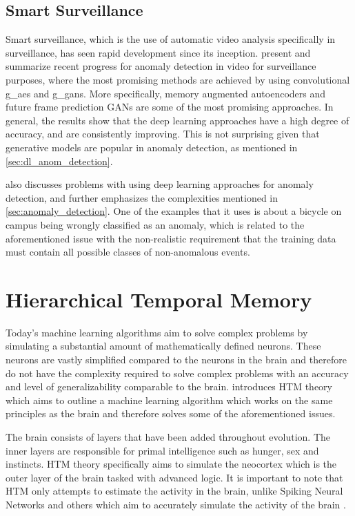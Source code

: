 \subsection{Smart Surveillance}
Smart surveillance, which is the use of automatic video analysis specifically in surveillance, has seen rapid development since its inception. \textcite{anomalyvideo, smart_surveillance_2} present and summarize recent progress for anomaly detection in video for surveillance purposes, where the most promising methods are achieved by using convolutional \glspl*{g_ae} and \glspl*{g_gan}. More specifically, memory augmented autoencoders\cite{memae} and future frame prediction GANs\cite{future_frame_prediction} are some of the most promising approaches. In general, the results show that the deep learning approaches have a high degree of accuracy, and are consistently improving. This is not surprising given that generative models are popular in anomaly detection, as mentioned in \autoref{sec:dl_anom_detection}.
\par
\textcite{anomalyvideo} also discusses problems with using deep learning approaches for anomaly detection, and further emphasizes the complexities mentioned in \autoref{sec:anomaly_detection}. One of the examples that it uses is about a bicycle on campus being wrongly classified as an anomaly, which is related to the aforementioned issue with the non-realistic requirement that the training data must contain all possible classes of non-anomalous events.

\section{Hierarchical Temporal Memory}
Today's machine learning algorithms aim to solve complex problems by simulating a substantial amount of mathematically defined neurons. These neurons are vastly simplified compared to the neurons in the brain and therefore do not have the complexity required to solve complex problems with an accuracy and level of generalizability comparable to the brain. \textcite{BAMI} introduces HTM theory which aims to outline a machine learning algorithm which works on the same principles as the brain and therefore solves some of the aforementioned issues.\par
The brain consists of layers that have been added throughout evolution. The inner layers are responsible for primal intelligence such as hunger, sex and instincts. HTM theory specifically aims to simulate the neocortex which is the outer layer of the brain tasked with advanced logic. It is important to note that HTM only attempts to estimate the activity in the brain, unlike Spiking Neural Networks and others which aim to accurately simulate the activity of the brain \cite{spiking_neural_networks}.
